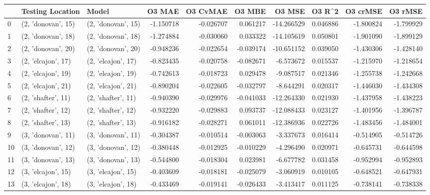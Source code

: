 \begin{tabular}{lllrrrrrrr}
\toprule
{} &    Testing Location &               Model &    O3 MAE &  O3 CvMAE &    O3 MBE &     O3 MSE &    O3 R\textasciicircum2 &  O3 crMSE &   O3 rMSE \\
\midrule
0  &  (2, 'donovan', 15) &  (2, 'donovan', 15) & -1.150718 & -0.026707 &  0.061217 & -14.266529 &  0.046886 & -1.800824 & -1.799929 \\
1  &  (2, 'donovan', 18) &  (2, 'donovan', 18) & -1.274884 & -0.030060 &  0.033322 & -14.105619 &  0.050801 & -1.901090 & -1.899129 \\
2  &  (2, 'donovan', 20) &  (2, 'donovan', 20) & -0.948236 & -0.022654 & -0.039174 & -10.651152 &  0.039050 & -1.430306 & -1.428140 \\
3  &  (2, 'elcajon', 17) &  (2, 'elcajon', 17) & -0.823435 & -0.020758 & -0.082671 &  -6.573672 &  0.015537 & -1.215970 & -1.218654 \\
4  &  (2, 'elcajon', 19) &  (2, 'elcajon', 19) & -0.742613 & -0.018723 &  0.029478 &  -9.087517 &  0.021346 & -1.255738 & -1.242668 \\
5  &  (2, 'elcajon', 21) &  (2, 'elcajon', 21) & -0.890204 & -0.022605 & -0.032797 &  -8.644291 &  0.020317 & -1.446030 & -1.434308 \\
6  &  (2, 'shafter', 11) &  (2, 'shafter', 11) & -0.940390 & -0.029976 & -0.041033 & -12.264330 &  0.021930 & -1.437958 & -1.438223 \\
7  &  (2, 'shafter', 12) &  (2, 'shafter', 12) & -0.932220 & -0.029883 &  0.093737 & -12.088433 &  0.023127 & -1.401956 & -1.396787 \\
8  &  (2, 'shafter', 13) &  (2, 'shafter', 13) & -0.916182 & -0.028271 &  0.061011 & -12.386936 &  0.022726 & -1.483456 & -1.484001 \\
9  &  (3, 'donovan', 11) &  (3, 'donovan', 11) & -0.304387 & -0.010514 & -0.003063 &  -3.337673 &  0.016414 & -0.514905 & -0.514726 \\
10 &  (3, 'donovan', 12) &  (3, 'donovan', 12) & -0.380448 & -0.012925 & -0.010229 &  -4.296490 &  0.020971 & -0.645731 & -0.644598 \\
11 &  (3, 'donovan', 13) &  (3, 'donovan', 13) & -0.544800 & -0.018304 &  0.023981 &  -6.677782 &  0.031458 & -0.952994 & -0.952893 \\
12 &  (3, 'elcajon', 15) &  (3, 'elcajon', 15) & -0.403609 & -0.018181 & -0.025079 &  -3.060919 &  0.010105 & -0.648521 & -0.647931 \\
13 &  (3, 'elcajon', 18) &  (3, 'elcajon', 18) & -0.433469 & -0.019141 & -0.026433 &  -3.413417 &  0.011125 & -0.738141 & -0.738338 \\

\end{tabular}
